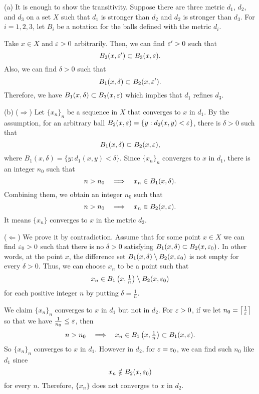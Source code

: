 \documentclass{../../large}
\begin{document}
\begin{pf}
(a)
It is enough to show the transitivity.
Suppose there are three metric $d_1$, $d_2$, and $d_3$ on a set $X$ such that $d_1$ is stronger than $d_2$ and $d_2$ is stronger than $d_3$.
For $i=1,2,3$, let $B_i$ be a notation for the balls defined with the metric $d_i$.

Take $x\in X$ and $\varepsilon>0$ arbitrarily.
Then, we can find $\varepsilon'>0$ such that
\[B_2(x,\varepsilon')\subset B_3(x,\varepsilon).\]
Also, we can find $\delta>0$ such that
\[B_1(x,\delta)\subset B_2(x,\varepsilon').\]
Therefore, we have $B_1(x,\delta)\subset B_3(x,\varepsilon)$ which implies that $d_1$ refines $d_3$.

(b)
($\Rightarrow$)
Let $\{x_n\}_n$ be a sequence in $X$ that converges to $x$ in $d_1$.
By the assumption, for an arbitrary ball $B_2(x,\varepsilon)=\{y:d_2(x,y)<\varepsilon\}$, there is $\delta>0$ such that
\[B_1(x,\delta)\subset B_2(x,\varepsilon),\]
where $B_1(x,\delta)=\{y:d_1(x,y)<\delta\}$.
Since $\{x_n\}_n$ converges to $x$ in $d_1$, there is an integer $n_0$ such that
\[n>n_0\impl x_n\in B_1(x,\delta).\]
Combining them, we obtain an integer $n_0$ such that
\[n>n_0\impl x_n\in B_2(x,\e).\]
It means $\{x_n\}$ converges to $x$ in the metric $d_2$.

($\Leftarrow$)
We prove it by contradiction.
Assume that for some point $x\in X$ we can find $\varepsilon_0>0$ such that there is no $\delta>0$ satisfying $B_1(x,\delta)\subset B_2(x,\varepsilon_0)$.
In other words, at the point $x$, the difference set $B_1(x,\delta)\setminus B_2(x,\varepsilon_0)$ is not empty for every $\delta>0$.
Thus, we can choose $x_n$ to be a point such that
\[x_n\in B_1\left(x,\tfrac1n\right)\setminus B_2(x,\varepsilon_0)\]
for each positive integer $n$ by putting $\delta=\frac1n$.

We claim $\{x_n\}_n$ converges to $x$ in $d_1$ but not in $d_2$.
For $\varepsilon>0$, if we let $n_0=\left\lceil\frac1{\varepsilon}\right\rceil$ so that we have $\frac1{n_0}\le\varepsilon$, then
\[n>n_0\impl x_n\in B_1\left(x,\tfrac1n\right)\subset B_1(x,\e).\]
So $\{x_n\}_n$ converges to $x$ in $d_1$.
However in $d_2$, for $\varepsilon=\varepsilon_0$, we can find such $n_0$ like $d_1$ since
\[x_n\notin B_2(x,\varepsilon_0)\]
for every $n$.
Therefore, $\{x_n\}$ does not converges to $x$ in $d_2$.
\end{pf}
\end{document}
